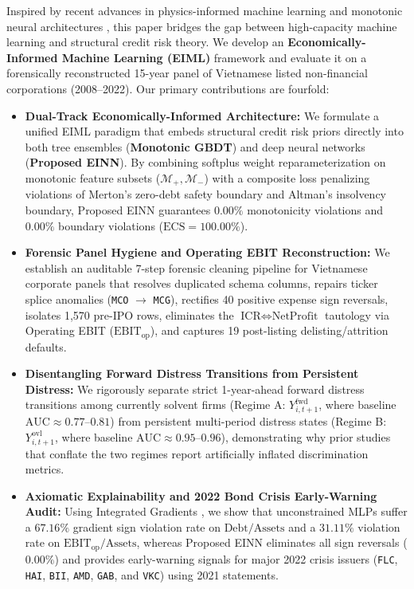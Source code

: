 \documentclass[11pt,a4paper]{article}
\begin{document}
Inspired by recent advances in physics-informed machine learning \citep{raissi2019physics,karniadakis2021physics} and monotonic neural architectures \citep{sill1997monotonic,you2017deep,runje2023constrained}, this paper bridges the gap between high-capacity machine learning and structural credit risk theory. We develop an \textbf{Economically-Informed Machine Learning (EIML)} framework and evaluate it on a forensically reconstructed 15-year panel of Vietnamese listed non-financial corporations (2008--2022). Our primary contributions are fourfold:
\begin{itemize}
    \item \textbf{Dual-Track Economically-Informed Architecture:} We formulate a unified EIML paradigm that embeds structural credit risk priors directly into both tree ensembles (\textbf{Monotonic GBDT}) and deep neural networks (\textbf{Proposed EINN}). By combining softplus weight reparameterization on monotonic feature subsets ($\mathcal{M}_+, \mathcal{M}_-$) with a composite loss penalizing violations of Merton's zero-debt safety boundary and Altman's insolvency boundary, Proposed EINN guarantees $0.00\%$ monotonicity violations and $0.00\%$ boundary violations ($\text{ECS} = 100.00\%$).
    \item \textbf{Forensic Panel Hygiene and Operating EBIT Reconstruction:} We establish an auditable 7-step forensic cleaning pipeline for Vietnamese corporate panels that resolves duplicated schema columns, repairs ticker splice anomalies (\texttt{MCO} $\to$ \texttt{MCG}), rectifies 40 positive expense sign reversals, isolates 1,570 pre-IPO rows, eliminates the $\text{ICR} \iff \text{NetProfit}$ tautology via Operating EBIT ($\text{EBIT}_{\text{op}}$), and captures 19 post-listing delisting/attrition defaults.
    \item \textbf{Disentangling Forward Distress Transitions from Persistent Distress:} We rigorously separate strict 1-year-ahead forward distress transitions among currently solvent firms (Regime A: $Y_{i,t+1}^{\text{fwd}}$, where baseline $\text{AUC} \approx 0.77\text{--}0.81$) from persistent multi-period distress states (Regime B: $Y_{i,t+1}^{\text{ovl}}$, where baseline $\text{AUC} \approx 0.95\text{--}0.96$), demonstrating why prior studies that conflate the two regimes report artificially inflated discrimination metrics.
    \item \textbf{Axiomatic Explainability and 2022 Bond Crisis Early-Warning Audit:} Using Integrated Gradients \citep{sundararajan2017axiomatic}, we show that unconstrained MLPs suffer a $67.16\%$ gradient sign violation rate on $\text{Debt}/\text{Assets}$ and a $31.11\%$ violation rate on $\text{EBIT}_{\text{op}}/\text{Assets}$, whereas Proposed EINN eliminates all sign reversals ($0.00\%$) and provides early-warning signals for major 2022 crisis issuers (\texttt{FLC}, \texttt{HAI}, \texttt{BII}, \texttt{AMD}, \texttt{GAB}, and \texttt{VKC}) using 2021 statements.
\end{itemize}
\end{document}
